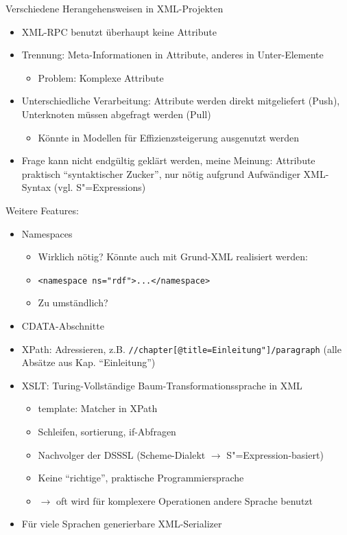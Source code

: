 \documentclass[a4paper, bibgerm]{book}
\newcommand\icode[1]{\lstinline?#1?}
\newcommand{\sexp}{S"=Expression}
\newcommand{\sexps}{S"=Expressions}
\begin{document}
Verschiedene Herangehensweisen in XML-Projekten
\begin{itemize}
\item XML-RPC benutzt überhaupt keine Attribute
\item Trennung: Meta-Informationen in Attribute, anderes in Unter-Elemente
  \begin{itemize}
  \item Problem: Komplexe Attribute
  \end{itemize}
\item Unterschiedliche Verarbeitung: Attribute werden direkt
  mitgeliefert (Push), Unterknoten müssen abgefragt werden (Pull)
  \begin{itemize}
  \item Könnte in Modellen für Effizienzsteigerung ausgenutzt werden
  \end{itemize}
\item Frage kann nicht endgültig geklärt werden, meine Meinung:
  Attribute praktisch "`syntaktischer Zucker"', nur nötig aufgrund
  Aufwändiger XML-Syntax (vgl. \sexps{})
\end{itemize}

Weitere Features:
\begin{itemize}
\item Namespaces
  \begin{itemize}
  \item Wirklich nötig? Könnte auch mit Grund-XML realisiert werden:
  \item \icode{<namespace ns="rdf">...</namespace>} %
  \item Zu umständlich?
  \end{itemize}
\item CDATA-Abschnitte
\end{itemize}

\begin{itemize}
\item XPath: Adressieren, z.B. \icode{//chapter[@title=Einleitung"]/paragraph}
  (alle Absätze aus Kap. ``Einleitung'')
\item XSLT: Turing-Vollständige Baum-Transformationssprache in XML
  \begin{itemize}
  \item template: Matcher in XPath
  \item Schleifen, sortierung, if-Abfragen
  \item Nachvolger der DSSSL (Scheme-Dialekt $\rightarrow$ \sexp{}-basiert)
  \item Keine ``richtige'', praktische Programmiersprache
  \item $\rightarrow$ oft wird für komplexere Operationen andere Sprache benutzt
  \end{itemize}
\item Für viele Sprachen generierbare XML-Serializer
\end{itemize}
\end{document}
